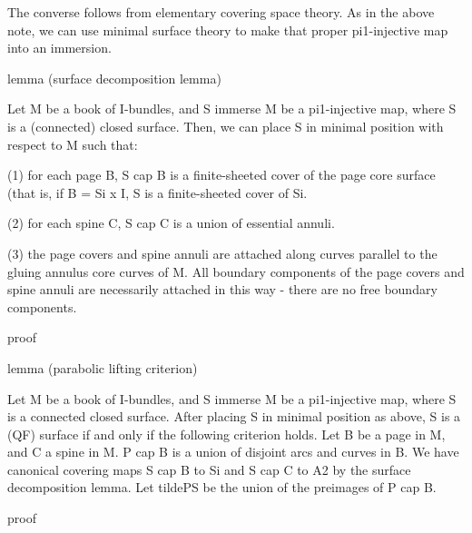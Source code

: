 The converse follows from elementary covering space theory. As in the above
note, we can use minimal surface theory to make that proper pi1-injective map
into an immersion.

lemma (surface decomposition lemma)

Let M be a book of I-bundles, and S immerse M be a pi1-injective map, where
S is a (connected) closed surface.  Then, we can place S in minimal position
with respect to M such that:

(1) for each page B, S cap B is a finite-sheeted cover of the page core surface
(that is, if B = Si x I, S is a finite-sheeted cover of Si.

(2) for each spine C, S cap C is a union of essential annuli.

(3) the page covers and spine annuli are attached along curves parallel to the
gluing annulus core curves of M. All boundary components of the page covers and
spine annuli are necessarily attached in this way - there are no free boundary
components.

proof


lemma (parabolic lifting criterion)

Let M be a book of I-bundles, and S immerse M be a pi1-injective map, where
S is a connected closed surface.  After placing S in minimal position as above,
S is a (QF) surface if and only if the following criterion holds. Let B be
a page in M, and C a spine in M. P cap B is a union of disjoint arcs and curves
in B. We have canonical covering maps S cap B to Si and S cap C to A2 by the
surface decomposition lemma. Let tildePS be the union of the preimages of P cap
B. %

proof


